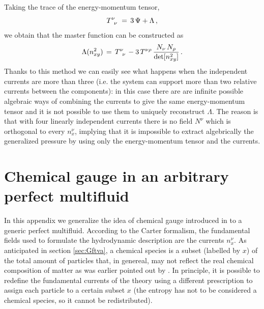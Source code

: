 \documentclass[usenatbib]{mnras}
\begin{document}
%
Taking the trace of the energy-momentum tensor,
%
\begin{equation}
T\indices{^\nu _\nu} \, = \, 3 \, \Psi + \Lambda \, ,
\end{equation}
%
we obtain that the master function can be constructed as
%
\begin{equation}
\Lambda(n_{xy}^2) 
\, = \, 
T\indices{^\nu _\nu} - 3 \, T^{\nu \rho} \, \dfrac{N_\nu \,  N_\rho}{ \det[n_{xy}^2]} \, .
\end{equation}
%
Thanks to this  method we can easily see what happens when the independent currents are more than three (i.e. the system can support more than two relative currents between the components): in this case there are are infinite possible algebraic ways of combining the currents to give the same energy-momentum tensor and it is not possible to use them to uniquely reconstruct $\Lambda$.
The reason is that with four linearly independent currents there is no field $N^\nu$ which is orthogonal to every $n_x^\nu$, implying that it is impossible to extract algebrically the generalized pressure by using only the energy-momentum tensor and the currents.

%



\section{Chemical gauge in an arbitrary perfect multifluid}
\label{Chemical gauge in an arbitrary perfect multifluid}


In this appendix we generalize the idea of chemical gauge introduced in \cite{carter_macro_2006} to a generic perfect multifluid. According to the Carter formalism, the fundamental fields used to formulate the hydrodynamic description are the currents $n_x^\nu$. As anticipated in section \ref{sec:Gftva}, a chemical species is a  subset (labelled by $x$) of the total amount of particles that, in genereal,  may not reflect the real chemical composition of matter  as was earlier pointed out by \cite{CarterKhalat92}. 
In principle, it is possible to redefine the fundamental currents of the theory using a different prescription to assign each particle to a certain subset $x$ (the entropy has not to be considered a chemical species, so it cannot be redistributed). 
\end{document}
